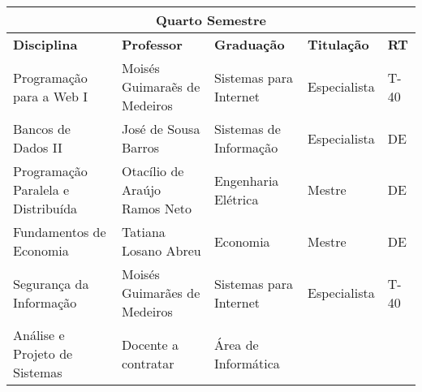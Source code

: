 \begin{table}[h!]
\scriptsize
\begin{tabular}{lllll}
\multicolumn{5}{c}{\cellcolor[HTML]{C0C0C0}\textbf{Quarto Semestre}}                                                                                                                                                                                                                                    \\ \hline
\multicolumn{1}{|p{5.2cm}|}{\cellcolor[HTML]{FFFFFF}\textbf{Disciplina}}                                    & \multicolumn{1}{p{5.2cm}|}{\textbf{Professor}}                 & \multicolumn{1}{p{3.1cm}|}{\textbf{Graduação}}     & \multicolumn{1}{p{1.7cm}|}{\textbf{Titulação}} & \multicolumn{1}{p{0.6cm}|}{\textbf{RT}} \\ \hline
\multicolumn{1}{|l|}{Programa\c{c}\~ao para a Web I}                                                            & \multicolumn{1}{l|}{Mois\'es Guimara\~es de Medeiros}             & \multicolumn{1}{l|}{Sistemas para Internet}          & \multicolumn{1}{l|}{Especialista}             & \multicolumn{1}{l|}{T-40}                          \\ \hline
\multicolumn{1}{|l|}{Bancos de Dados II} & \multicolumn{1}{l|}{Jos\'e de Sousa Barros}        & \multicolumn{1}{l|}{Sistemas de Informa\c{c}\~ao}             & \multicolumn{1}{l|}{Especialista}             & \multicolumn{1}{l|}{DE}                          \\ \hline
\multicolumn{1}{|l|}{\cellcolor[HTML]{FFFFFF}Programa\c{c}\~ao Paralela e Distribu\'ida}                         & \multicolumn{1}{l|}{Otac\'ilio de Ara\'ujo Ramos Neto}   & \multicolumn{1}{l|}{Engenharia El\'etrica}             & \multicolumn{1}{l|}{Mestre}             & \multicolumn{1}{l|}{DE}                        \\ \hline
\multicolumn{1}{|l|}{Fundamentos de Economia}                                             & \multicolumn{1}{l|}{Tatiana Losano Abreu}                 & \multicolumn{1}{l|}{Economia}  & \multicolumn{1}{l|}{Mestre}             & \multicolumn{1}{l|}{DE}                          \\ \hline
\multicolumn{1}{|l|}{Seguran\c{c}a da Informa\c{c}\~ao}                                                      & \multicolumn{1}{l|}{Mois\'es Guimar\~aes de Medeiros} & \multicolumn{1}{l|}{Sistemas para Internet}  & \multicolumn{1}{l|}{Especialista}             & \multicolumn{1}{l|}{T-40}                          \\ \hline
\multicolumn{1}{|l|}{An\'alise e Projeto de Sistemas}                                                         & \multicolumn{1}{l|}{Docente a contratar}       & \multicolumn{1}{l|}{\'Area de Inform\'atica} & \multicolumn{1}{l|}{}       & \multicolumn{1}{l|}{}                        \\ \hline
\end{tabular}
\end{table}


